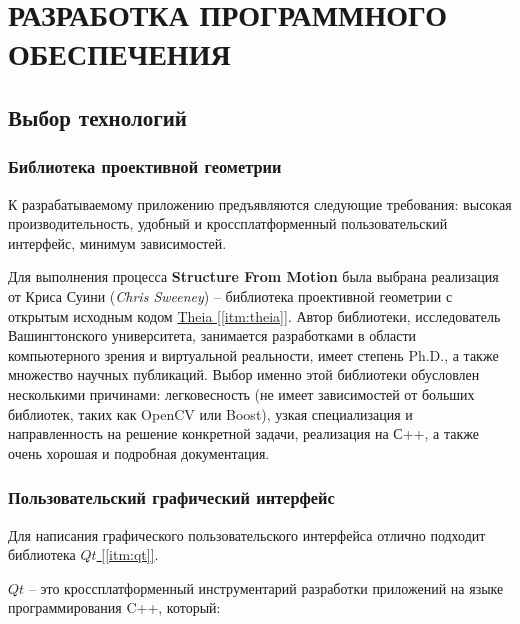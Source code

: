 \chapter{РАЗРАБОТКА ПРОГРАММНОГО ОБЕСПЕЧЕНИЯ}

\section{Выбор технологий}

\subsection{Библиотека проективной геометрии}
К разрабатываемому приложению предъявляются следующие требования: высокая производительность, удобный и кроссплатформенный пользовательский интерфейс, минимум зависимостей. 

Для выполнения процесса \textbf{Structure From Motion} была выбрана реализация от Криса Суини (\textit{Chris Sweeney}) -- библиотека проективной геометрии с открытым исходным кодом \hyperref[itm:theia]{Theia [\ref{itm:theia}]}. Автор библиотеки, исследователь Вашингтонского университета, занимается разработками в области компьютерного зрения и виртуальной реальности, имеет степень Ph.D., а также множество научных публикаций. Выбор именно этой библиотеки обусловлен несколькими причинами: легковесность (не имеет зависимостей от больших библиотек, таких как OpenCV или Boost), узкая специализация и направленность на решение конкретной задачи, реализация на С++, а также очень хорошая и подробная документация.

\subsection{Пользовательский графический интерфейс}
Для написания графического пользовательского интерфейса отлично подходит библиотека \hyperref[itm:qt]{$Qt$ [\ref{itm:qt}]}.

$Qt$ -- это кроссплатформенный инструментарий разработки приложений на языке программирования C++, который:

